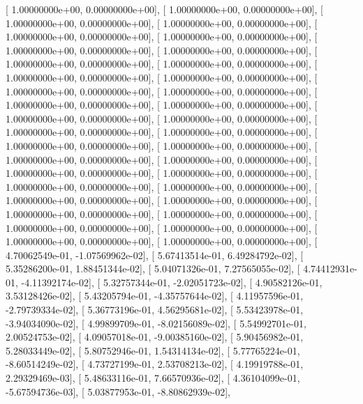 \documentclass{article}
\begin{document}
       [  1.00000000e+00,   0.00000000e+00],
       [  1.00000000e+00,   0.00000000e+00],
       [  1.00000000e+00,   0.00000000e+00],
       [  1.00000000e+00,   0.00000000e+00],
       [  1.00000000e+00,   0.00000000e+00],
       [  1.00000000e+00,   0.00000000e+00],
       [  1.00000000e+00,   0.00000000e+00],
       [  1.00000000e+00,   0.00000000e+00],
       [  1.00000000e+00,   0.00000000e+00],
       [  1.00000000e+00,   0.00000000e+00],
       [  1.00000000e+00,   0.00000000e+00],
       [  1.00000000e+00,   0.00000000e+00],
       [  1.00000000e+00,   0.00000000e+00],
       [  1.00000000e+00,   0.00000000e+00],
       [  1.00000000e+00,   0.00000000e+00],
       [  1.00000000e+00,   0.00000000e+00],
       [  1.00000000e+00,   0.00000000e+00],
       [  1.00000000e+00,   0.00000000e+00],
       [  1.00000000e+00,   0.00000000e+00],
       [  1.00000000e+00,   0.00000000e+00],
       [  1.00000000e+00,   0.00000000e+00],
       [  1.00000000e+00,   0.00000000e+00],
       [  1.00000000e+00,   0.00000000e+00],
       [  1.00000000e+00,   0.00000000e+00],
       [  1.00000000e+00,   0.00000000e+00],
       [  1.00000000e+00,   0.00000000e+00],
       [  1.00000000e+00,   0.00000000e+00],
       [  1.00000000e+00,   0.00000000e+00],
       [  1.00000000e+00,   0.00000000e+00],
       [  1.00000000e+00,   0.00000000e+00],
       [  1.00000000e+00,   0.00000000e+00],
       [  1.00000000e+00,   0.00000000e+00],
       [  1.00000000e+00,   0.00000000e+00],
       [  1.00000000e+00,   0.00000000e+00],
       [  1.00000000e+00,   0.00000000e+00],
       [  1.00000000e+00,   0.00000000e+00],
       [  4.70062549e-01,  -1.07569962e-02],
       [  5.67413514e-01,   6.49284792e-02],
       [  5.35286200e-01,   1.88451344e-02],
       [  5.04071326e-01,   7.27565055e-02],
       [  4.74412931e-01,  -4.11392174e-02],
       [  5.32757344e-01,  -2.02051723e-02],
       [  4.90582126e-01,   3.53128426e-02],
       [  5.43205794e-01,  -4.35757644e-02],
       [  4.11957596e-01,  -2.79739334e-02],
       [  5.36773196e-01,   4.56295681e-02],
       [  5.53423978e-01,  -3.94034090e-02],
       [  4.99899709e-01,  -8.02156089e-02],
       [  5.54992701e-01,   2.00524753e-02],
       [  4.09057018e-01,  -9.00385160e-02],
       [  5.90456982e-01,   5.28033449e-02],
       [  5.80752946e-01,   1.54314134e-02],
       [  5.77765224e-01,  -8.60514249e-02],
       [  4.73727199e-01,   2.53708213e-02],
       [  4.19919788e-01,   2.29329469e-03],
       [  5.48633116e-01,   7.66570936e-02],
       [  4.36104099e-01,  -5.67594736e-03],
       [  5.03877953e-01,  -8.80862939e-02],
\end{document}
